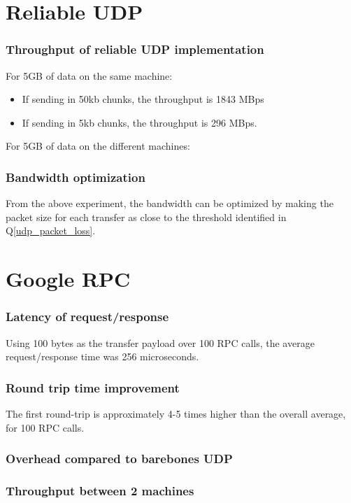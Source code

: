 \documentclass[a4paper]{article}
\begin{document}
\part{Reliable UDP}

\section{Throughput of reliable UDP implementation}
For 5GB of data on the same machine:
\begin{itemize}
	\item If sending in 50kb chunks, the throughput is 1843 MBps
	\item If sending in 5kb chunks, the throughput is 296 MBps.
\end{itemize}

For 5GB of data on the different machines:


\section{Bandwidth optimization}
From the above experiment, the bandwidth can be optimized by making the packet size for each transfer as close to the threshold identified in Q\ref{udp_packet_loss}.

\part{Google RPC}

\section{Latency of request/response}
Using 100 bytes as the transfer payload over 100 RPC calls, the average request/response time was 256 microseconds.

\section{Round trip time improvement}
The first round-trip is approximately 4-5 times higher than the overall average, for 100 RPC calls.

\section{Overhead compared to barebones UDP}


\section{Throughput between 2 machines}
\end{document}

